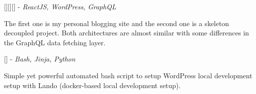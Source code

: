 \documentclass[]{resume}
\begin{document}
            [\textbf{\href{https://souptik.dev}{}}][\textbf{\href{https://github.com/Souptik2001/Souptik2001.github.io}{}}][\textbf{\href{https://github.com/Souptik2001/wp-decoupled-sample}{}}] - \textit{ReactJS, WordPress, GraphQL}

           The first one is my personal blogging site and the second one is a skeleton decoupled project. Both architectures are almost similar with some differences in the GraphQL data fetching layer.\\

           \sectionsep

           [\textbf{\href{https://github.com/Souptik2001/wordpress.setup}{}}] - \textit{Bash, Jinja, Python}

           Simple yet powerful automated bash script to setup WordPress local development setup with Lando (docker-based local development setup).

           \sectionsep


     \ 
     
\end{document}
